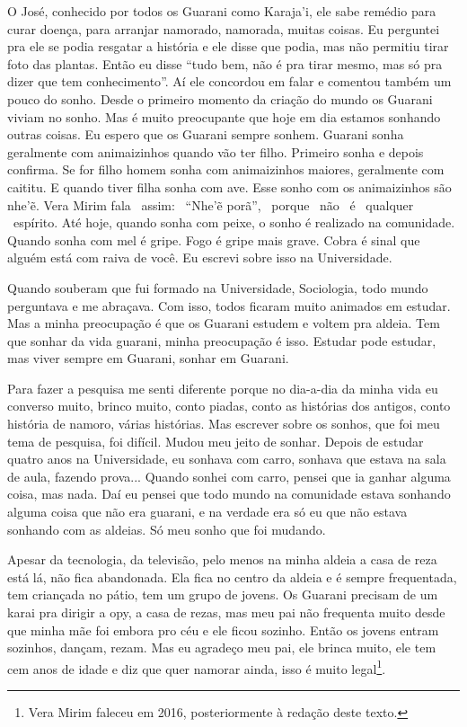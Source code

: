 \documentclass{article}
\begin{document}
O Jos\'e, conhecido por todos os Guarani como Karaja{\textquoteright}i,
ele sabe rem\'edio para curar doen\c{c}a, para arranjar namorado,
namorada, muitas coisas. Eu perguntei pra ele se podia resgatar a
hist\'oria e ele disse que podia, mas n\~ao permitiu tirar foto das
plantas. Ent\~ao eu disse {\textquotedblleft}tudo bem, n\~ao \'e pra
tirar mesmo, mas s\'o pra dizer que tem
conhecimento{\textquotedblright}. A\'i ele concordou em falar e
comentou tamb\'em um pouco do sonho. Desde o primeiro momento da
cria\c{c}\~ao do mundo os Guarani viviam no sonho. Mas \'e muito
preocupante que hoje em dia estamos sonhando outras coisas. Eu espero
que os Guarani sempre sonhem. Guarani sonha geralmente com animaizinhos
quando v\~ao ter filho. Primeiro sonha e depois confirma. Se for filho
homem sonha com animaizinhos maiores, geralmente com caititu. E quando
tiver filha sonha com ave. Esse sonho com os animaizinhos s\~ao
nhe{\textquoteright}\~{e}. Vera Mirim fala ~assim:
~{\textquotedblleft}Nhe{\textquoteright}\~{e} 
por\~a{\textquotedblright}, ~porque ~n\~ao ~\'e ~qualquer ~esp\'irito.
At\'e hoje, quando sonha com peixe, o sonho \'e realizado na
comunidade. Quando sonha com mel \'e gripe. Fogo \'e gripe mais grave.
Cobra \'e sinal que algu\'em est\'a com raiva de voc\^e. Eu escrevi
sobre isso na Universidade.

Quando souberam que fui formado na Universidade, Sociologia, todo mundo
perguntava e me abra\c{c}ava. Com isso, todos ficaram muito animados em
estudar. Mas a minha preocupa\c{c}\~ao \'e que os Guarani estudem e
voltem pra aldeia. Tem que sonhar da vida guarani, minha
preocupa\c{c}\~ao \'e isso. Estudar pode estudar, mas viver sempre em
Guarani, sonhar em Guarani.

Para fazer a pesquisa me senti diferente porque no dia-a-dia da minha
vida eu converso muito, brinco muito, conto piadas, conto as
hist\'orias dos antigos, conto hist\'oria de namoro, v\'arias
hist\'orias. Mas escrever sobre os sonhos, que foi meu tema de
pesquisa, foi dif\'icil. Mudou meu jeito de sonhar. Depois de estudar
quatro anos na Universidade, eu sonhava com carro, sonhava que estava
na sala de aula, fazendo prova... Quando sonhei com carro, pensei que
ia ganhar alguma coisa, mas nada. Da\'i eu pensei que todo mundo na
comunidade estava sonhando alguma coisa que n\~ao era guarani, e na
verdade era s\'o eu que n\~ao estava sonhando com as aldeias. S\'o meu
sonho que foi mudando.

Apesar da tecnologia, da televis\~ao, pelo menos na minha aldeia a casa
de reza est\'a l\'a, n\~ao fica abandonada. Ela fica no centro da
aldeia e \'e sempre frequentada, tem crian\c{c}ada no p\'atio, tem um
grupo de jovens. Os Guarani precisam de um karai pra dirigir a opy, a
casa de rezas, mas meu pai n\~ao frequenta muito desde que minha m\~ae
foi embora pro c\'eu e ele ficou sozinho. Ent\~ao os jovens entram
sozinhos, dan\c{c}am, rezam. Mas eu agrade\c{c}o meu pai, ele brinca
muito, ele tem cem anos de idade e diz que quer namorar ainda, isso \'e
muito legal\footnote{  Vera Mirim faleceu em 2016, posteriormente \`a
reda\c{c}\~ao deste texto.}.
\end{document}
